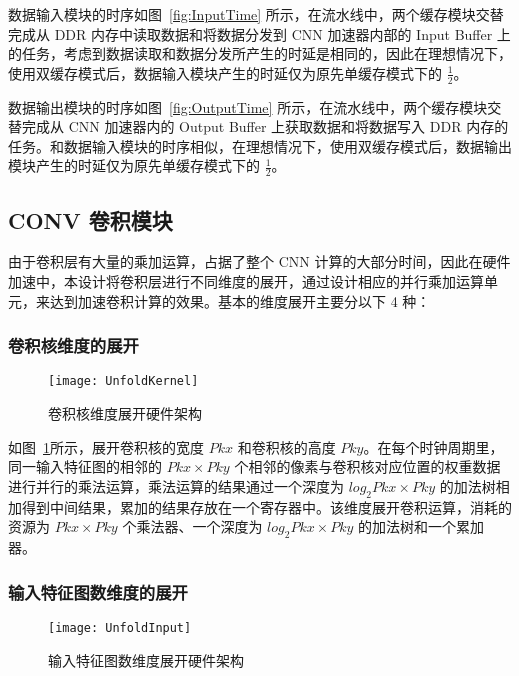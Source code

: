 数据输入模块的时序如图~\ref{fig:InputTime} 所示，在流水线中，两个缓存模块交替完成从 DDR 内存中读取数据和将数据分发到 CNN 加速器内部的 Input Buffer 上的任务，考虑到数据读取和数据分发所产生的时延是相同的，因此在理想情况下，使用双缓存模式后，数据输入模块产生的时延仅为原先单缓存模式下的 $\frac{1}{2}$。

数据输出模块的时序如图~\ref{fig:OutputTime} 所示，在流水线中，两个缓存模块交替完成从 CNN 加速器内的 Output Buffer 上获取数据和将数据写入 DDR 内存的任务。和数据输入模块的时序相似，在理想情况下，使用双缓存模式后，数据输出模块产生的时延仅为原先单缓存模式下的 $\frac{1}{2}$。

\subsection{CONV 卷积模块}

由于卷积层有大量的乘加运算，占据了整个 CNN 计算的大部分时间，因此在硬件加速中，本设计将卷积层进行不同维度的展开，通过设计相应的并行乘加运算单元，来达到加速卷积计算的效果。基本的维度展开主要分以下 4 种：

\subsubsection{卷积核维度的展开}

\begin{figure}[!htbp]
    \centering
    \texttt{[image: UnfoldKernel]}
    \caption{卷积核维度展开硬件架构}
    \label{fig:UnfoldKernel}
\end{figure}

如图~\ref{fig:UnfoldKernel}所示，展开卷积核的宽度 $Pkx$ 和卷积核的高度 $Pky$。在每个时钟周期里，同一输入特征图的相邻的 $Pkx \times Pky$ 个相邻的像素与卷积核对应位置的权重数据进行并行的乘法运算，乘法运算的结果通过一个深度为 $log_2{Pkx \times Pky}$ 的加法树相加得到中间结果，累加的结果存放在一个寄存器中。该维度展开卷积运算，消耗的资源为 $Pkx \times Pky$ 个乘法器、一个深度为 $log_2{Pkx \times Pky}$ 的加法树和一个累加器。

\subsubsection{输入特征图数维度的展开}

\begin{figure}[!htbp]
    \centering
    \texttt{[image: UnfoldInput]}
    \caption{输入特征图数维度展开硬件架构}
    \label{fig:UnfoldInput}
\end{figure}

